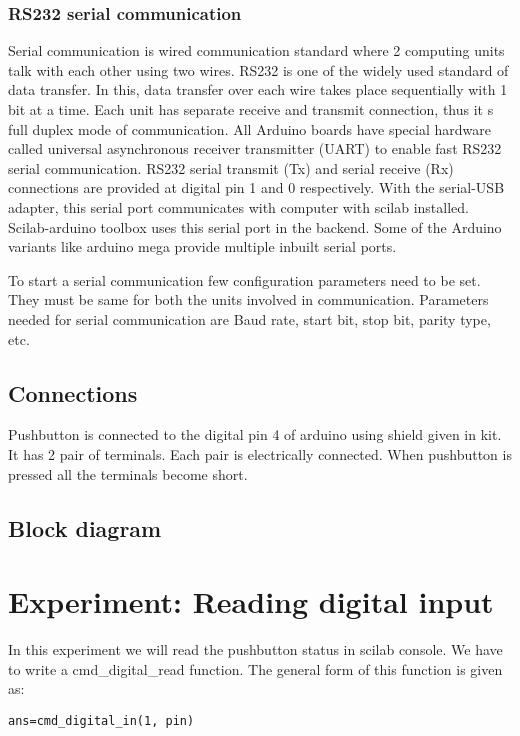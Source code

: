 \subsubsection{RS232 serial communication}
Serial communication is wired communication standard where 2 computing units talk with each other using two wires. RS232 is one of the widely used standard of  data transfer. In this, data transfer over each wire takes place sequentially with 1 bit at a time. Each unit has separate receive and transmit connection, thus it s full duplex mode of communication. All Arduino boards have special hardware called universal asynchronous receiver transmitter (UART) to enable fast RS232 serial communication. RS232 serial transmit (Tx) and serial receive (Rx) connections are provided at digital pin 1 and 0 respectively. With the serial-USB adapter, this serial port communicates with computer with scilab installed. Scilab-arduino toolbox uses this serial port in the backend. Some of the Arduino variants like arduino mega provide multiple inbuilt serial ports. 

To start a serial communication few configuration parameters need to be set. They must be same for both the units involved in communication. Parameters needed for serial communication are Baud rate, start bit, stop bit, parity type, etc.

\subsection{Connections}
Pushbutton is connected  to the digital pin 4 of arduino using shield given in kit. It has 2 pair of terminals. Each pair is electrically connected. When pushbutton is pressed all the terminals become short.  

\subsection{Block diagram}

\section{Experiment: Reading digital input}
In this experiment we will read the pushbutton status in scilab console. We have to write a cmd\_digital\_read function. The general form of this function is given as:
\begin{lstlisting}
ans=cmd_digital_in(1, pin)
\end{lstlisting}


